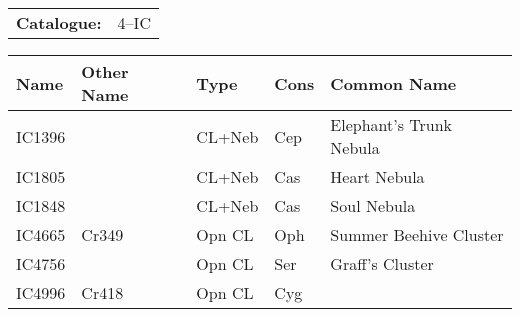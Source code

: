 \begin{tabular}{ p{0.9in} p{1.3in}}
{\bf Catalogue:} & 4--IC \\ 
\end{tabular}
\begin{longtable}{ p{0.7in}  p{1.0in}  p{0.6in}  p{0.9in}  p{5.1in} }
\hline 
{\bf Name} & {\bf Other Name} & {\bf Type} & {\bf Cons} & {\bf Common Name} \\ 
\hline 
IC1396 &  & CL+Neb & Cep & Elephant's Trunk Nebula \\ 
IC1805 &  & CL+Neb & Cas & Heart Nebula \\ 
IC1848 &  & CL+Neb & Cas & Soul Nebula \\ 
IC4665 & Cr349 & Opn CL & Oph & Summer Beehive Cluster \\ 
IC4756 &  & Opn CL & Ser & Graff's Cluster \\ 
IC4996 & Cr418 & Opn CL & Cyg &  \\ 
\hline 
\end{longtable} 
